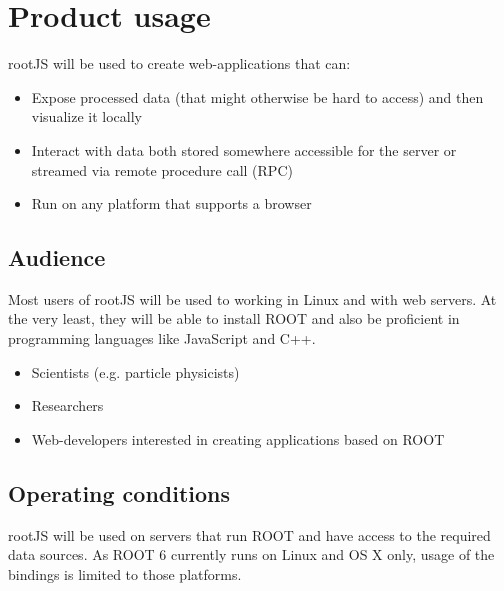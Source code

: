 \chapter{Product usage}

rootJS will be used to create web-applications that can:
\begin{itemize}
	\item Expose processed data (that might otherwise be hard to access) and then visualize it locally
	\item Interact with data both stored somewhere accessible for the server or streamed via remote procedure call (RPC)
	\item Run on any platform that supports a browser
\end{itemize}


\section{Audience}
Most users of rootJS will be used to working in Linux and with web servers. At the very least, they will be able to install ROOT
and also be proficient in programming languages like JavaScript and C++.
\begin{itemize}
	\item Scientists (e.g. particle physicists)
	\item Researchers
	\item Web-developers interested in creating applications based on ROOT
\end{itemize}

\section{Operating conditions}

rootJS will be used on servers that run ROOT and have access to the required data sources. As ROOT 6 currently runs on Linux and OS X only, usage of the bindings is limited to those platforms.
